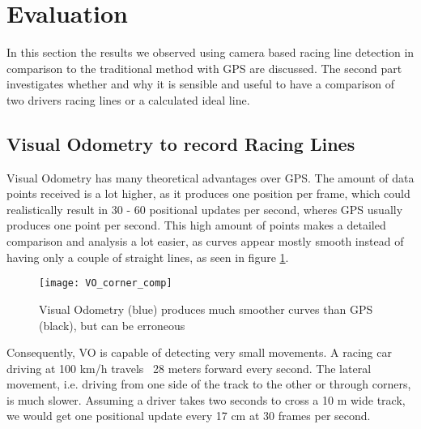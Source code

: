 \section{Evaluation}
\label{sec:evaluation}
In this section the results we observed using camera based racing line detection in comparison to the traditional method with GPS are discussed. The second part investigates whether and why it is sensible and useful to have a comparison of two drivers racing lines or a calculated ideal line.

\subsection{Visual Odometry to record Racing Lines}
Visual Odometry has many theoretical advantages over GPS. The amount of data points received is a lot higher, as it produces one position per frame, which could realistically result in 30 - 60 positional updates per second, wheres GPS usually produces one point per second. This high amount of points makes a detailed comparison and analysis a lot easier, as curves appear mostly smooth instead of having only a couple of straight lines, as seen in figure \ref{fig:vo_gps_comp}.

\begin{figure}[!ht]
	\centering
	\texttt{[image: VO\_corner\_comp]}
	\caption{Visual Odometry (blue) produces much smoother curves than GPS (black), but can be erroneous}
	\label{fig:vo_gps_comp}
\end{figure}

Consequently, VO is capable of detecting very small movements. A racing car driving at 100 km/h travels ~28 meters forward every second. The lateral movement, i.e. driving from one side of the track to the other or through corners, is much slower. Assuming a driver takes two seconds to cross a 10 m wide track, we would get one positional update every 17 cm at 30 frames per second. 

